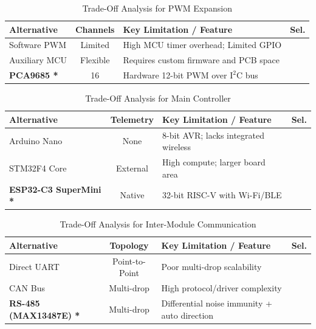 \documentclass[lettersize,journal]{IEEEtran}
\begin{document}
	\begin{table}[!t]
		\centering
		\caption{Trade-Off Analysis for PWM Expansion}
		\label{tab:alt_pwm}
		\scriptsize
		\setlength{\tabcolsep}{3pt}
		\renewcommand{\arraystretch}{1.1}
		\begin{tabularx}{\columnwidth}{@{}l c X c@{}}
			\toprule
			\textbf{Alternative} & \textbf{Channels} & \textbf{Key Limitation / Feature} & \textbf{Sel.} \\
			\midrule
			Software PWM \cite{esp32c3} & Limited & High MCU timer overhead; Limited GPIO & \\
			Auxiliary MCU \cite{stm32f4} & Flexible & Requires custom firmware and PCB space & \\
			\textbf{PCA9685 \cite{pca9685}*} & 16 & Hardware 12-bit PWM over $\text{I}^2\text{C}$ bus & \checkmark \\
			\bottomrule
		\end{tabularx}
	\end{table}
	
	\begin{table}[!t]
		\centering
		\caption{Trade-Off Analysis for Main Controller}
		\label{tab:alt_processing}
		\scriptsize
		\setlength{\tabcolsep}{3pt}
		\renewcommand{\arraystretch}{1.1}
		\begin{tabularx}{\columnwidth}{@{}l c X c@{}}
			\toprule
			\textbf{Alternative} & \textbf{Telemetry} & \textbf{Key Limitation / Feature} & \textbf{Sel.} \\
			\midrule
			Arduino Nano \cite{atmega328p} & None & 8-bit AVR; lacks integrated wireless & \\
			STM32F4 Core \cite{stm32f4} & External & High compute; larger board area & \\
			\textbf{ESP32-C3 SuperMini \cite{esp32c3}*} & Native & 32-bit RISC-V with Wi-Fi/BLE & \checkmark \\
			\bottomrule
		\end{tabularx}
	\end{table}
	
	\begin{table}[!t]
		\centering
		\caption{Trade-Off Analysis for Inter-Module Communication}
		\label{tab:alt_comm}
		\scriptsize
		\setlength{\tabcolsep}{3pt}
		\renewcommand{\arraystretch}{1.1}
		\begin{tabularx}{\columnwidth}{@{}l c X c@{}}
			\toprule
			\textbf{Alternative} & \textbf{Topology} & \textbf{Key Limitation / Feature} & \textbf{Sel.} \\
			\midrule
			Direct UART \cite{esp32c3} & Point-to-Point & Poor multi-drop scalability & \\
			CAN Bus \cite{sn65hvd230} & Multi-drop & High protocol/driver complexity & \\
			\textbf{RS-485 (MAX13487E) \cite{max13487e}*} & Multi-drop & Differential noise immunity + auto direction & \checkmark \\
			\bottomrule
		\end{tabularx}
	\end{table}
	
\end{document}
